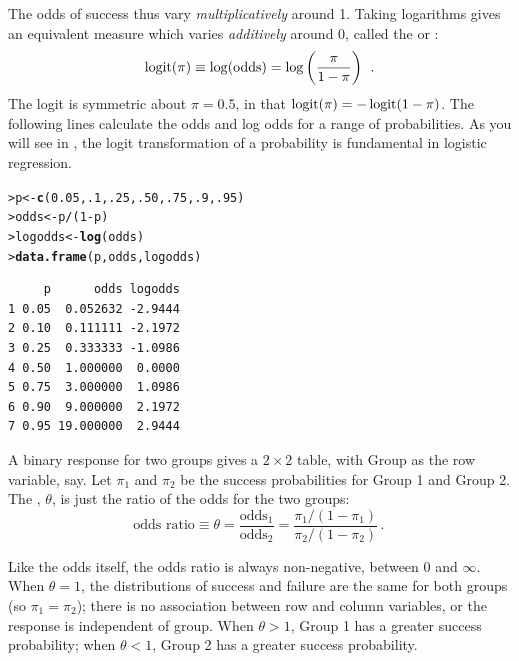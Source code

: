 \documentclass[10pt,krantz2]{krantz}\usepackage[]{graphicx}\usepackage[]{color}
\makeatletter
\newcommand{\hlnum}[1]{\textcolor[rgb]{0.686,0.059,0.569}{#1}}%
\newcommand{\hlopt}[1]{\textcolor[rgb]{0,0,0}{#1}}%
\newcommand{\hlstd}[1]{\textcolor[rgb]{0.345,0.345,0.345}{#1}}%
\newcommand{\hlkwb}[1]{\textcolor[rgb]{0.69,0.353,0.396}{#1}}%
\newcommand{\hlkwd}[1]{\textcolor[rgb]{0.737,0.353,0.396}{\textbf{#1}}}%
\newenvironment{kframe}{%
 \def\at@end@of@kframe{}%
 \ifinner\ifhmode%
  \def\at@end@of@kframe{\end{minipage}}%
  \begin{minipage}{\columnwidth}%
 \fi\fi%
 \def\FrameCommand##1{\hskip\@totalleftmargin \hskip-\fboxsep
 \colorbox{shadecolor}{##1}\hskip-\fboxsep
     \hskip-\linewidth \hskip-\@totalleftmargin \hskip\columnwidth}%
 \MakeFramed {\advance\hsize-\width
   \@totalleftmargin\z@ \linewidth\hsize
   \@setminipage}}%
 {\par\unskip\endMakeFramed%
 \at@end@of@kframe}
\newenvironment{knitrout}{}{} %
\renewenvironment{knitrout}{\small\renewcommand{\baselinestretch}{.85}}{} %
\makeatother
\begin{document}
The odds of success thus vary \emph{multiplicatively} around 1.  Taking logarithms
gives an equivalent measure which varies \emph{additively} around 0, called the
 or :
\begin{equation}\label{eq:logit}
 \logit (\pi) \equiv \log (\mbox{odds}) = \log \left( \frac{\pi}{1-\pi} \right)
 \period
\end{equation}
The logit is symmetric about $\pi = 0.5$, in that
$\logit (\pi) = - \logit (1-\pi)$.  The following lines calculate the odds
and log odds for a range of probabilities. As you will see in
, the logit transformation of a probability is fundamental
in logistic regression.

\begin{knitrout}
\color{fgcolor}\begin{kframe}
\begin{alltt}
\hlstd{> }\hlstd{p} \hlkwb{<-} \hlkwd{c}\hlstd{(}\hlnum{0.05}\hlstd{,} \hlnum{.1}\hlstd{,} \hlnum{.25}\hlstd{,} \hlnum{.50}\hlstd{,} \hlnum{.75}\hlstd{,} \hlnum{.9}\hlstd{,} \hlnum{.95}\hlstd{)}
\hlstd{> }\hlstd{odds} \hlkwb{<-} \hlstd{p} \hlopt{/} \hlstd{(}\hlnum{1} \hlopt{-} \hlstd{p)}
\hlstd{> }\hlstd{logodds} \hlkwb{<-} \hlkwd{log}\hlstd{(odds)}
\hlstd{> }\hlkwd{data.frame}\hlstd{(p, odds, logodds)}
\end{alltt}
\begin{verbatim}
     p      odds logodds
1 0.05  0.052632 -2.9444
2 0.10  0.111111 -2.1972
3 0.25  0.333333 -1.0986
4 0.50  1.000000  0.0000
5 0.75  3.000000  1.0986
6 0.90  9.000000  2.1972
7 0.95 19.000000  2.9444
\end{verbatim}
\end{kframe}
\end{knitrout}

A binary response for two groups gives a $2 \times 2$ table, with
Group as the row variable, say.  Let $\pi_1$ and $\pi_2$ be the
success probabilities for Group 1 and Group 2.  The , $\theta$,
is just the ratio of the odds for the two groups:
\begin{equation*}%
 \mbox{odds ratio} \equiv \theta =
 \frac{\mbox{odds}_1} {\mbox{odds}_2} =
 \frac{\pi_1 / (1-\pi_1)} {\pi_2 / (1-\pi_2)}
 \period
\end{equation*}

Like the odds itself, the odds ratio is always non-negative, between
0 and $\infty$.  When $\theta = 1$, the distributions of success and
failure are the same for both groups (so $\pi_1 = \pi_2$);  there is
no association between row and column variables, or the response
is independent of group.
When $\theta > 1$, Group 1 has a greater success probability;
when $\theta < 1$, Group 2 has a greater success probability.
\end{document}
